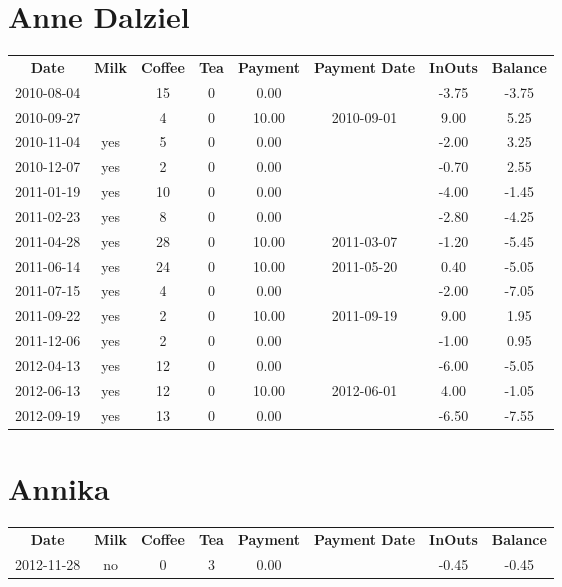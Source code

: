\section{Anne Dalziel}

\begin{center}
\begin{tabular}{cccccccc}
\textbf{Date} & \textbf{Milk} & \textbf{Coffee} & \textbf{Tea} & \textbf{Payment} & \textbf{Payment Date} & \textbf{InOuts} & \textbf{Balance} \\
2010-08-04 &  & 15 & 0 &  0.00 &  & -3.75 & -3.75\\ 
2010-09-27 &  &  4 & 0 & 10.00 & 2010-09-01 &  9.00 &  5.25\\ 
2010-11-04 & yes &  5 & 0 &  0.00 &  & -2.00 &  3.25\\ 
2010-12-07 & yes &  2 & 0 &  0.00 &  & -0.70 &  2.55\\ 
2011-01-19 & yes & 10 & 0 &  0.00 &  & -4.00 & -1.45\\ 
2011-02-23 & yes &  8 & 0 &  0.00 &  & -2.80 & -4.25\\ 
2011-04-28 & yes & 28 & 0 & 10.00 & 2011-03-07 & -1.20 & -5.45\\ 
2011-06-14 & yes & 24 & 0 & 10.00 & 2011-05-20 &  0.40 & -5.05\\ 
2011-07-15 & yes &  4 & 0 &  0.00 &  & -2.00 & -7.05\\ 
2011-09-22 & yes &  2 & 0 & 10.00 & 2011-09-19 &  9.00 &  1.95\\ 
2011-12-06 & yes &  2 & 0 &  0.00 &  & -1.00 &  0.95\\ 
2012-04-13 & yes & 12 & 0 &  0.00 &  & -6.00 & -5.05\\ 
2012-06-13 & yes & 12 & 0 & 10.00 & 2012-06-01 &  4.00 & -1.05\\ 
2012-09-19 & yes & 13 & 0 &  0.00 &  & -6.50 & -7.55
\end{tabular}
\end{center}

\section{Annika}

\begin{center}
\begin{tabular}{cccccccc}
\textbf{Date} & \textbf{Milk} & \textbf{Coffee} & \textbf{Tea} & \textbf{Payment} & \textbf{Payment Date} & \textbf{InOuts} & \textbf{Balance} \\
2012-11-28 & no & 0 & 3 & 0.00 &  & -0.45 & -0.45
\end{tabular}
\end{center}

